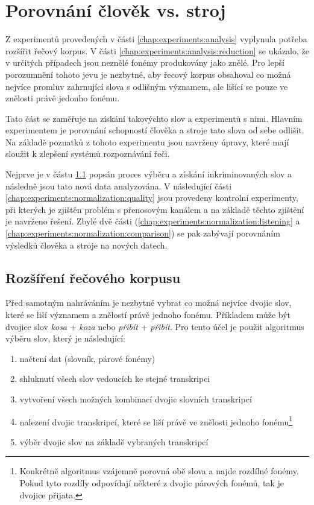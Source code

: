 \section{Porovnání člověk vs. stroj}
\label{chap:experiments:normalization}

Z experimentů provedených v části \ref{chap:experiments:analysis} vyplynula potřeba rozšířit řečový korpus. V části \ref{chap:experiments:analysis:reduction} se ukázalo, že v určitých případech jsou neznělé fonémy produkovány jako znělé. Pro lepší porozumnění tohoto jevu je nezbytné, aby řecový korpus obsahoval co možná nejvíce promluv zahrnující slova s odlišným významem, ale lišící se pouze ve znělosti právě jedonho fonému.

Tato část se zaměřuje na získání takovýchto slov a experimentů s nimi. Hlavním experimentem je porovnání schopností člověka a stroje tato slova od sebe odlišit. Na základě poznatků z tohoto experimentu jsou navrženy úpravy, které mají sloužit k zlepšení systémů rozpoznávání řeči.

Nejprve je v částu \ref{chap:experiments:normalization:corpus} popsán proces výběru a získání inkriminovaných slov a následně jsou tato nová data analyzována. V následující části \ref{chap:experiments:normalization:quality} jsou provedeny kontrolní experimenty, při kterých je zjištěn problém s přenosovým kanálem a na základě těchto zjištění je navrženo řešení. Zbylé dvě části (\ref{chap:experiments:normalization:listening} a \ref{chap:experiments:normalization:comparison}) se pak zabývají porovnáním výsledků člověka a stroje na nových datech.

\subsection{Rozšíření řečového korpusu}
\label{chap:experiments:normalization:corpus}

Před samotným nahráváním je nezbytné vybrat co možná nejvíce dvojic slov, které se liší významem a znělostí právě jednoho fonému. Příkladem může být dvojice slov \textit{kosa} + \textit{koza} nebo \textit{přibít} + \textit{přibít}. Pro tento účel je použit algoritmus výběru slov, který je následující:

\begin{enumerate}
  \item načtení dat (slovník, párové fonémy)
  \item shluknutí všech slov vedoucích ke stejné transkripci
  \item vytvoření všech možných kombinací dvojic slovních transkripcí
  \item nalezení dvojic transkripcí, které se liší právě ve znělosti jednoho fonému\footnote{Konkrétně algoritmus vzájemně porovná obě slova a najde rozdílné fonémy. Pokud tyto rozdíly odpovídají některé z dvojic párových fonémů, tak je dvojice přijata.}
  \item výběr dvojic slov na základě vybraných transkripcí
\end{enumerate}


